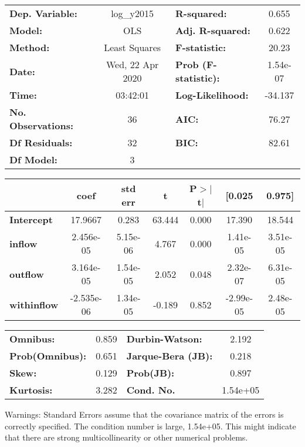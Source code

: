\begin{center}
\begin{tabular}{lclc}
\toprule
\textbf{Dep. Variable:}    &    log\_y2015    & \textbf{  R-squared:         } &     0.655   \\
\textbf{Model:}            &       OLS        & \textbf{  Adj. R-squared:    } &     0.622   \\
\textbf{Method:}           &  Least Squares   & \textbf{  F-statistic:       } &     20.23   \\
\textbf{Date:}             & Wed, 22 Apr 2020 & \textbf{  Prob (F-statistic):} &  1.54e-07   \\
\textbf{Time:}             &     03:42:01     & \textbf{  Log-Likelihood:    } &   -34.137   \\
\textbf{No. Observations:} &          36      & \textbf{  AIC:               } &     76.27   \\
\textbf{Df Residuals:}     &          32      & \textbf{  BIC:               } &     82.61   \\
\textbf{Df Model:}         &           3      & \textbf{                     } &             \\
\bottomrule
\end{tabular}
\begin{tabular}{lcccccc}
                    & \textbf{coef} & \textbf{std err} & \textbf{t} & \textbf{P$> |$t$|$} & \textbf{[0.025} & \textbf{0.975]}  \\
\midrule
\textbf{Intercept}  &      17.9667  &        0.283     &    63.444  &         0.000        &       17.390    &       18.544     \\
\textbf{inflow}     &    2.456e-05  &     5.15e-06     &     4.767  &         0.000        &     1.41e-05    &     3.51e-05     \\
\textbf{outflow}    &    3.164e-05  &     1.54e-05     &     2.052  &         0.048        &     2.32e-07    &     6.31e-05     \\
\textbf{withinflow} &   -2.535e-06  &     1.34e-05     &    -0.189  &         0.852        &    -2.99e-05    &     2.48e-05     \\
\bottomrule
\end{tabular}
\begin{tabular}{lclc}
\textbf{Omnibus:}       &  0.859 & \textbf{  Durbin-Watson:     } &    2.192  \\
\textbf{Prob(Omnibus):} &  0.651 & \textbf{  Jarque-Bera (JB):  } &    0.218  \\
\textbf{Skew:}          &  0.129 & \textbf{  Prob(JB):          } &    0.897  \\
\textbf{Kurtosis:}      &  3.282 & \textbf{  Cond. No.          } & 1.54e+05  \\
\bottomrule
\end{tabular}
\end{center}

Warnings: \newline
 [1] Standard Errors assume that the covariance matrix of the errors is correctly specified. \newline
 [2] The condition number is large, 1.54e+05. This might indicate that there are \newline
 strong multicollinearity or other numerical problems.